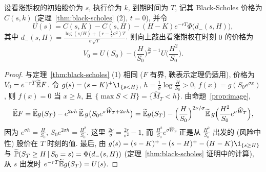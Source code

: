 \begin{theorem}[向上敲出看涨期权]\label{thm:barrier}
设看涨期权的初始股价为 $s$, 执行价为 $k$, 到期时间为 $T$, 记其 Black-Scholes 价格为 $C(s,k)$ (定理~\ref{thm:black-scholes} (2), $t=0$), 并令
\[
U(s)=C(s,K)-C(s,H)-(H-K)e^{-rT}\Phi\big(d_-(s,H)\big),
\]
其中 $d_-(s,H)=\frac{\log(s/H)+(r-\frac{1}{2}\sigma^2)T}{\sigma\sqrt{T}}$. 则向上敲出看涨期权在时刻 $0$ 的价格为
\[
V_0=U(S_0)-\Big(\frac{H}{S_0}\Big)^{\frac{2r}{\sigma^2}-1}U\Big(\frac{H^2}{S_0}\Big).
\]
\end{theorem}

\begin{proof}
与定理~\ref{thm:black-scholes} (1) 相同 ($F$ 有界, 鞅表示定理仍适用), 价格为 $V_0=e^{-rT}\widetilde{\E}F$. 令 $g(s)=(s-K)^+\1_{\{s<H\}}$, $h=\frac{1}{\sigma}\log\frac{H}{S_0}>0$, $f(x)=g(S_0e^{\sigma x})$, 则 $f(x)=0$ 当 $x\ge h$, 且 $\{\max S<H\}=\{\widehat{M}_T<h\}$. 由命题~\ref{prop:image},
\[
\widetilde{\E}F=\widetilde{\E}g(S_T)-e^{2\nu h}\,\widetilde{\E}\,g\big(S_0e^{\sigma\widehat{W}_T+2\sigma h}\big)=\widetilde{\E}g(S_T)-\Big(\frac{H}{S_0}\Big)^{2\nu/\sigma}\widetilde{\E}\,g\Big(\frac{H^2}{S_0}e^{\sigma\widehat{W}_T}\Big),
\]
因为 $e^{\sigma h}=\frac{H}{S_0}$, $S_0e^{2\sigma h}=\frac{H^2}{S_0}$. 这里 $\frac{2\nu}{\sigma}=\frac{2r}{\sigma^2}-1$, 而 $\frac{H^2}{S_0}e^{\sigma\widehat{W}_T}$ 正是从 $\frac{H^2}{S_0}$ 出发的 (风险中性) 股价在 $T$ 时刻的值. 最后, 由 $g(s)=(s-K)^+-(s-H)^+-(H-K)\1_{\{s\ge H\}}$ 与 $\widetilde{\P}(S_T\ge H\,|\,S_0=s)=\Phi(d_-(s,H))$ (定理~\ref{thm:black-scholes} 证明中的计算), 从 $s$ 出发时 $e^{-rT}\widetilde{\E}g(S_T)=U(s)$.
\end{proof}

